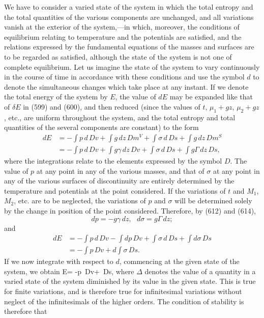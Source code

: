 \documentclass[12pt]{article}
\newcommand{\dd}{\delta}
\begin{document}
We have to consider a varied state of the system in which the total entropy and the total quantities of the various components are unchanged, and all variations vanish at the exterior of the system,---in which, moreover, the conditions of equilibrium relating to temperature and the potentials are satisfied, and the relations expressed by the fundamental equations of the masses and surfaces are to be regarded as satisfied, although the state of the system is not one of complete equilibrium. Let us imagine the state of the system to vary continuously in the course of time in accordance with these conditions and use the symbol $d$ to denote the simultaneous changes which take place at any instant. If we denote the total energy of the system by $E$, the value of $dE$ may be expanded like that of $\dd E$ in (599) and (600), and then reduced (since the values of $t$, $\mu_1+gz$, $\mu_2+gz$, etc., are uniform throughout the system, and the total entropy and total quantities of the several components are constant) to the form
\begin{align} dE &= -\int p \, d\, Dv +\int g \, dz \, Dm^V +\int \sigma \,d\,Ds +\int g \, dz\, Dm^S \nonumber \\
 &= -\int p \, d\, Dv +\int g \gamma\, dz \, Dv +\int \sigma \,d\,Ds +\int g \Gamma \, dz\, Ds,  \label{621} \end{align}
where the integrations relate to the elements expressed by the symbol $D$. The value of $p$ at any point in any of the various masses, and that of $\sigma$ at any point in any of the various surfaces of discontinuity are entirely determined by the temperature and potentials at the point considered. If the variations of $t$ and $M_1$, $M_2$, etc. are to be neglected, the variations of $p$ and $\sigma$ will be determined solely by the change in position of the point considered. Therefore, by (612) and (614),
$$dp=-g\gamma \, dz, \ \ \ d\sigma =g\Gamma \, dz;$$
and
\begin{align} dE&= -\int p \,d\, Dv -\int dp \, Dv +\int \sigma \, d\, Ds +\int d\sigma \, Ds\nonumber \\
 &=    -\int p \, Dv+d\int \sigma\, Ds.   \label{622} \end{align}
If we now integrate with respect to $d$, commencing at the given state of the system, we obtain
\eqs \Delta E= -\Delta \int p \,Dv+ \Delta \int \sigma  \,Ds,   \label{623} \eqe
where $\Delta$ denotes the value of a quantity in a varied state of the system diminished by its value in the given state. This is true for finite variations, and is therefore true for infinitesimal variations without neglect of the infinitesimals of the higher orders. The condition of stability is therefore that
\end{document}

